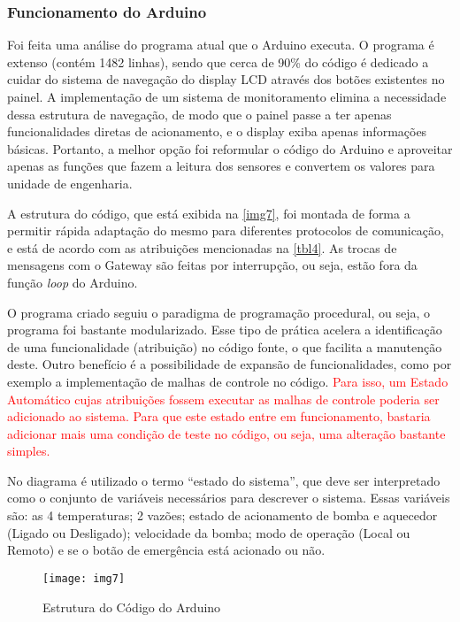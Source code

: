 			
			\subsubsection{Funcionamento do Arduino}
				\label{sec:met_arduino}
				Foi feita uma análise do programa atual que o Arduino executa. O programa é extenso (contém 1482 linhas), sendo que cerca de 90\% do código é dedicado a cuidar do sistema de navegação do display LCD através dos botões existentes no painel.  A implementação de um sistema de monitoramento elimina a necessidade dessa estrutura de navegação, de modo que o painel passe a ter apenas funcionalidades diretas de acionamento, e o display exiba apenas informações básicas. Portanto, a melhor opção foi reformular o código do Arduino e aproveitar apenas as funções que fazem a leitura dos sensores e convertem os valores para unidade de engenharia.
				
				A estrutura do código, que está exibida na \autoref{img7}, foi montada de forma a permitir rápida adaptação do mesmo para diferentes protocolos de comunicação, e está de acordo com as atribuições mencionadas na \autoref{tbl4}. As trocas de mensagens com o Gateway são feitas por interrupção, ou seja, estão fora da função \textit{loop} do Arduino. 
				
				O programa criado seguiu o paradigma de programação procedural, ou seja, o programa foi bastante modularizado. Esse tipo de prática acelera a identificação de uma funcionalidade (atribuição) no código fonte, o que facilita a manutenção deste. Outro benefício é a possibilidade de expansão de funcionalidades, como por exemplo a implementação de malhas de controle no código. \textcolor{red}{ Para isso, um Estado Automático cujas atribuições fossem executar as malhas de controle poderia ser adicionado ao sistema. Para que este estado entre em funcionamento, bastaria adicionar mais uma condição de teste no código, ou seja, uma alteração bastante simples.}
				
				No diagrama é utilizado o termo ``estado do sistema'', que deve ser interpretado como o conjunto de variáveis necessários para descrever o sistema. Essas variáveis são: as 4 temperaturas; 2 vazões; estado de acionamento de bomba e aquecedor (Ligado ou Desligado); velocidade da bomba; modo de operação (Local ou Remoto) e se o botão de emergência está acionado ou não.
			
				\begin{figure}[!htb]	
					\captionsetup{justification=centering}
					\begin{center}
						\texttt{[image: img7]}  %
						\caption[Estrutura do Código do Arduino]{\label{img7} Estrutura do Código do Arduino }
					\end{center}		
				\end{figure}
			
